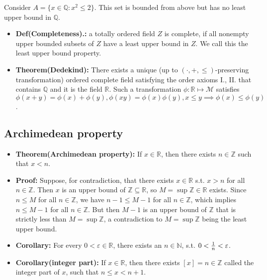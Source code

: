 \documentclass{article}
\begin{document}
Consider $A=\{x\in \mathbb{Q}:x^2\leq 2\}$. This set is bounded from above but has no least upper bound in $\mathbb{Q}$.

\begin{itemize}
\item \textbf{Def(Completeness).:} a totally ordered field $Z$ is complete, if all nonempty upper bounded subsets of $Z$ have a least upper bound in $Z$. We call this the least upper bound property.

\item \textbf{Theorem(Dedekind):} There exists a unique (up to $(\cdot, +,\leq)$-preserving transformation) ordered complete field satisfying the order axioms I., II. that contains $\mathbb{Q}$ and it is the field $\mathbb{R}$.
Such a transformation $\phi:\mathbb{R}\mapsto \mathcal{M}$ satisfies $\phi(x+y)=\phi(x)+\phi(y), \phi(xy)=\phi(x)\phi(y), x\leq y \implies \phi(x)\leq \phi(y)$.
\end{itemize}

\subsection{Archimedean property}

\begin{itemize}
\item \textbf{Theorem(Archimedean property):} If $x\in \mathbb{R}$, then there exists $n\in \mathbb{Z}$ such that $x<n$.

\item \textbf{Proof:} Suppose, for contradiction, that there exists $x\in \mathbb{R}$ s.t. $x>n$ for all $n\in \mathbb{Z}$. Then $x$ is an upper bound of $\mathbb{Z\subseteq\mathbb{R}}$, so $M=\sup\mathbb{Z}\in\mathbb{R}$ exists. Since $n\leq M$ for all $n\in \mathbb{Z}$, we have $n-1\leq M-1$ for all $n\in \mathbb{Z}$, which implies $n\leq M-1$ for all $n\in \mathbb{Z}$. But then $M-1$ is an upper bound of $\mathbb{Z}$ that is strictly less than $M=\sup \mathbb{Z}$, a contradiction to $M=\sup \mathbb{Z}$ being the least upper bound.

\item \textbf{Corollary:} For every $0<\varepsilon\in \mathbb{R}$, there exists an $n\in \mathbb{N}$, s.t. $0<{1\over n}<\varepsilon$.

\item \textbf{Corollary(integer part):} If $x\in \mathbb{R}$, then there exists $[x]=n\in \mathbb{Z}$ called the integer part of $x$, such that $n\leq x<n+1$.
\end{itemize}
\end{document}
